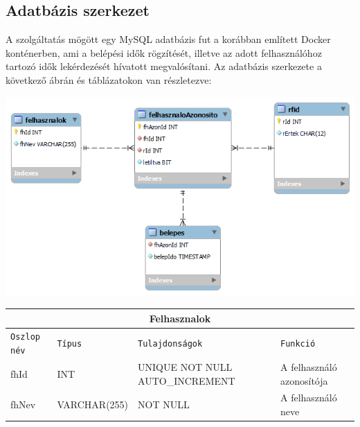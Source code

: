 \documentclass[11pt, a4paper]{article}
\begin{document}
		\subsection{Adatbázis szerkezet}
			\begin{flushleft}
				\justifying
				A szolgáltatás mögött egy MySQL adatbázis fut a korábban említett Docker konténerben, ami a belépési idők rögzítését, illetve az adott felhasználóhoz tartozó idők lekérdezését hívatott megvalósítani. Az adatbázis szerkezete a következő ábrán és táblázatokon van részletezve: \\
			\end{flushleft}
			\begin{minipage}{\linewidth}
				\centering
				\includegraphics[width=0.9\linewidth]{../db/db_diagram}
				\label{fig:dbdiagram}
			\end{minipage}
			\vfill
				\begin{minipage}{\linewidth}
					\fontsize{10}{16}\selectfont
					\centering
					\begin{tabular}{||m{6em} m{6.5em} m{10em} m{12em}||}
						\hline
						\multicolumn{4}{|c|}{\textbf{Felhasznalok}} \\
						\hline
						\texttt{Oszlop név} & \texttt{Típus} & \texttt{Tulajdonságok} & \texttt{Funkció} \\ 
						\hline\hline
						fhId & INT & UNIQUE NOT NULL AUTO\_INCREMENT & A felhasználó azonosítója \\ 
						\hline
						fhNev & VARCHAR(255) & NOT NULL & A felhasználó neve \\
						\hline
					\end{tabular}
					\label{table:1}
				\end{minipage}
				\vfill
				
\end{document}
